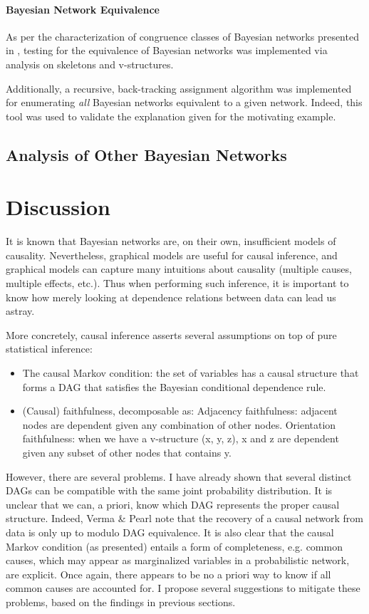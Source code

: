 \documentclass{article}
\begin{document}
	\paragraph{Bayesian Network Equivalence}
	As per the characterization of congruence classes of Bayesian networks presented in \cite{verma2013equivalence,chickering2013transformational}, testing for the equivalence of Bayesian networks was implemented via analysis on skeletons and v-structures.
	
	Additionally, a recursive, back-tracking assignment algorithm was implemented for enumerating \emph{all} Bayesian networks equivalent to a given network.
	Indeed, this tool was used to validate the explanation given for the motivating example.
	
	\subsection{Analysis of Other Bayesian Networks}
	
	\section{Discussion}
	
	It is known that Bayesian networks are, on their own, insufficient models of causality.
	Nevertheless, graphical models are useful for causal inference, and graphical models can capture many intuitions about causality (multiple causes, multiple effects, etc.).
	Thus when performing such inference, it is important to know how merely looking at dependence relations between data can lead us astray.
	
	More concretely, causal inference asserts several assumptions on top of pure statistical inference\cite{ramsey2012adjacencyfaithfulness}:
	\begin{itemize}
		\item The causal Markov condition: the set of variables has a causal structure that forms a DAG that satisfies the Bayesian conditional dependence rule.
		\item (Causal) faithfulness, decomposable as:
			\subitem Adjacency faithfulness: adjacent nodes are dependent given any combination of other nodes.
			\subitem Orientation faithfulness: when we have a v-structure (x, y, z), x and z are dependent given any subset of other nodes that contains y.
	\end{itemize}
	However, there are several problems.
	I have already shown that several distinct DAGs can be compatible with the same joint probability distribution.
	It is unclear that we can, a priori, know which DAG represents the proper causal structure.
	Indeed, Verma \& Pearl note that the recovery of a causal network from data is only up to modulo DAG equivalence\cite{verma2013equivalence}.
	It is also clear that the causal Markov condition (as presented) entails a form of completeness, e.g. common causes, which may appear as marginalized variables in a probabilistic network, are explicit.
	Once again, there appears to be no a priori way to know if all common causes are accounted for. I propose several suggestions to mitigate these problems, based on the findings in previous sections.
	
\end{document}
